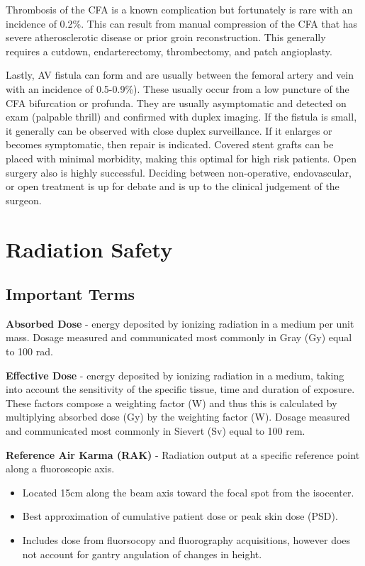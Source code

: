 \documentclass[
]{book}
\begin{document}
Thrombosis of the CFA is a known complication but fortunately is rare
with an incidence of 0.2\%. This can result from manual compression of
the CFA that has severe atherosclerotic disease or prior groin
reconstruction. This generally requires a cutdown, endarterectomy,
thrombectomy, and patch angioplasty.

Lastly, AV fistula can form and are usually between the femoral artery
and vein with an incidence of 0.5-0.9\%). These usually occur from a low
puncture of the CFA bifurcation or profunda. They are usually
asymptomatic and detected on exam (palpable thrill) and confirmed with
duplex imaging. If the fistula is small, it generally can be observed
with close duplex surveillance. If it enlarges or becomes symptomatic,
then repair is indicated. Covered stent grafts can be placed with
minimal morbidity, making this optimal for high risk patients. Open
surgery also is highly successful. Deciding between non-operative,
endovascular, or open treatment is up for debate and is up to the
clinical judgement of the surgeon.

\hypertarget{radiation-safety}{%
\section{Radiation Safety}\label{radiation-safety}}

\hypertarget{important-terms}{%
\subsection{Important Terms}\label{important-terms}}

\textbf{Absorbed Dose} - energy deposited by ionizing radiation in a medium
per unit mass. Dosage measured and communicated most commonly in Gray
(Gy) equal to 100 rad.\citep{reed2019}

\textbf{Effective Dose} - energy deposited by ionizing radiation in a medium,
taking into account the sensitivity of the specific tissue, time and
duration of exposure. These factors compose a weighting factor (W) and
thus this is calculated by multiplying absorbed dose (Gy) by the
weighting factor (W). Dosage measured and communicated most commonly in
Sievert (Sv) equal to 100 rem.\citep{reed2019}

\textbf{Reference Air Karma (RAK)} - Radiation output at a specific reference
point along a fluoroscopic axis.\citep{kirkwood2013}

\begin{itemize}
\item
  Located 15cm along the beam axis toward the focal spot from the
  isocenter.
\item
  Best approximation of cumulative patient dose or peak skin dose
  (PSD).\citep{kwon2011}
\item
  Includes dose from fluorsocopy and fluorography acquisitions,
  however does not account for gantry angulation of changes in height.
\end{itemize}
\end{document}
